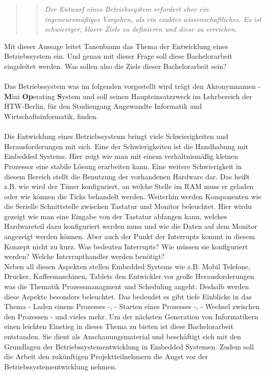 \begin{quote}
\blockquote{\textit{Der Entwurf eines Betriebssystem erfordert eher ein ingeneursm\"a\ss iges Vorgehen, als ein exaktes wissenschaftliches. Es ist schwieriger, klaere Ziele zu definieren und diese zu erreichen.}}\parencite[911]{os}
\end{quote}
Mit dieser Aussage leitet Tanenbaum das Thema der Entwicklung eines Betriebssystem ein. Und genau mit dieser Frage soll diese Bachelorarbeit eingeleitet werden. Was sollen also die Ziele dieser Bachelorarbeit sein?\\\\
Das Betriebssystem was im folgenden vorgestellt wird tr\"agt den Akronymnamen \mops - \textbf{M}ini \textbf{Op}erating \textbf{S}ystem und soll seinen Haupteinsatzzweck im Lehrbereich der HTW-Berlin, f\"ur den Studiengang Angewandte Informatik und Wirtschaftsinformatik, finden.\\ \\
Die Entwicklung eines Betriebssystems bringt viele Schwierigkeiten und Herausforderungen mit sich. Eine der Schwierigkeiten ist die Handhabung mit Embedded Systems. Hier zeigt \mops wie man mit einem verh\"altnism\"a\ss ig kleinen Prozessor eine stabile L\"osung erarbeiten kann. Eine weitere Schwierigkeit in diesem Bereich stellt die Benutzung der vorhandenen Hardware dar. Das hei\ss t z.B. wie wird der Timer konfiguriert, an welche Stelle im RAM muss er geladen oder wie k\"onnen die Ticks behandelt werden. Weiterhin werden Komponenten wie die Serielle Schnittstelle zwischen Tastatur und Monitor beleuchtet. Hier wirdu gezeigt wie man eine Eingabe von der Tastatur abfangen kann, welches Hardwareteil dazu konfiguriert werden muss und wie die Daten auf dem Monitor angezeigt werden k\"onnen. Aber auch der Punkt der Interrupts kommt in diesem Konzept nicht zu kurz. Was bedeuten Interrupts? Wie m\"ussen sie konfiguriert werden? Welche Interrupthandler werden ben\"otigt?\\ Neben all diesen Aspekten stellen Embedded Systems wie z.B. Mobil Telefone, Drucker, Kaffeemaschinen, Tablets den Entwickler vor gro\ss e Herausforderungen was die Thematik Prozessmanagment und Scheduling angeht. Deshalb werden diese Aspekte besonders beleuchtet. Das bedeudet es gibt tiefe Einblicke in das Thema - Laden einens Prozesses -, - Starten eines Prozesses -, - Wechsel zwischen den Prozessen - und vieles mehr. Um der n\"achsten Generation von Informatikern einen leichten Einstieg in dieses Thema zu bieten ist diese Bachelorarbeit entstanden. Sie dient als Anschauungsmaterial und besch\"aftigt sich mit den Grundlagen der Betriebssystementwicklung in Embedded Systemen. Zudem soll die Arbeit den zuk\"unftigen Projektteilnehmern die Angst vor der Betriebssystementwicklung nehmen. \\
